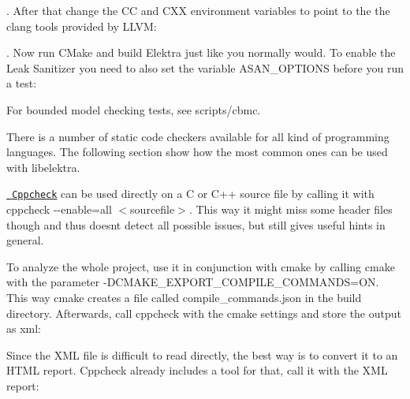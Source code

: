 \begin{DoxyCode}{0}
\end{DoxyCode}


. After that change the {\ttfamily CC} and {\ttfamily C\+XX} environment variables to point to the the clang tools provided by L\+L\+VM\+:


\begin{DoxyCode}{0}
\end{DoxyCode}


. Now run C\+Make and build Elektra just like you normally would. To enable the Leak Sanitizer you need to also set the variable {\ttfamily A\+S\+A\+N\+\_\+\+O\+P\+T\+I\+O\+NS} before you run a test\+:


\begin{DoxyCode}{0}
\end{DoxyCode}


For bounded model checking tests, see {\ttfamily scripts/cbmc}.

There is a number of static code checkers available for all kind of programming languages. The following section show how the most common ones can be used with {\ttfamily libelektra}.

\href{http://cppcheck.sourceforge.net/}{\texttt{ Cppcheck}} can be used directly on a C or C++ source file by calling it with {\ttfamily cppcheck -\/-\/enable=all $<$sourcefile$>$}. This way it might miss some header files though and thus doesn\textquotesingle{}t detect all possible issues, but still gives useful hints in general.

To analyze the whole project, use it in conjunction with {\ttfamily cmake} by calling {\ttfamily cmake} with the parameter {\ttfamily -\/D\+C\+M\+A\+K\+E\+\_\+\+E\+X\+P\+O\+R\+T\+\_\+\+C\+O\+M\+P\+I\+L\+E\+\_\+\+C\+O\+M\+M\+A\+N\+DS=ON}. This way {\ttfamily cmake} creates a file called {\ttfamily compile\+\_\+commands.\+json} in the build directory. Afterwards, call {\ttfamily cppcheck} with the cmake settings and store the output as xml\+:


\begin{DoxyCode}{0}
\end{DoxyCode}


Since the X\+ML file is difficult to read directly, the best way is to convert it to an H\+T\+ML report. Cppcheck already includes a tool for that, call it with the X\+ML report\+:


